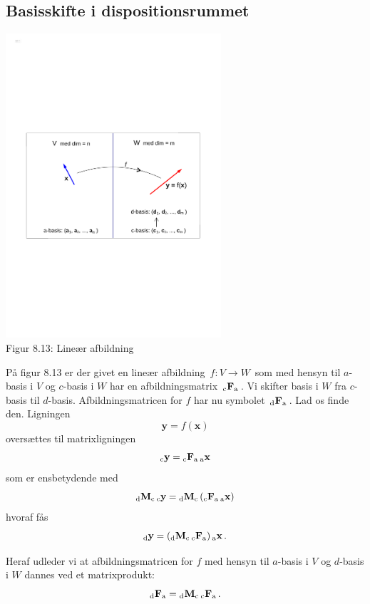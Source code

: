 \subsection{Basisskifte i dispositionsrummet}

\begin{center}
		\includegraphics[trim=2cm 9cm 2cm
 9cm,width=0.60\textwidth,clip]{linAfbVW3.pdf}
  \\Figur 8.13: Lineær afbildning 
\end{center}

På figur 8.13 er der givet en lineær afbildning $\,f:V\rightarrow W\,$ som med hensyn til $a$-basis i $V$ og $c$-basis i $W$ har en afbildningsmatrix $\,{_\mathrm{c}\mathbf{F}_\mathrm{a}}\,$. Vi skifter basis i $W$ fra $c$-basis til $d$-basis. Afbildningsmatricen for $f$ har nu symbolet $\,{_\mathrm{d}\mathbf{F}_\mathrm{a}}\,$. Lad os finde den. Ligningen $$ \mathbf y = f(\mathbf x)$$ oversættes til matrixligningen $$
{_\mathrm{c}\mathbf{y}} ={_\mathrm{c}\mathbf{F}_\mathrm{a}}\,{_\mathrm{a}\mathbf{x}} $$
som er ensbetydende med
$$
{_\mathrm{d}\mathbf{M}_\mathrm{c}}\,{_\mathrm{c}\mathbf{y}}={_\mathrm{d}\mathbf{M}_\mathrm{c}}\,({_\mathrm{c}\mathbf{F}_\mathrm{a}}\,{_\mathrm{a}\mathbf{x}})$$
hvoraf fås
$$
{_\mathrm{d}\mathbf{y}}=({_\mathrm{d}\mathbf{M}_\mathrm{c}}\,{_\mathrm{c}\mathbf{F}_\mathrm{a}})\,{_\mathrm{a}\mathbf{x}}\,.
$$ 

Heraf udleder vi at afbildningsmatricen for $f$ med hensyn til $a$-basis i $V$ og $d$-basis i $W$ dannes ved et matrixprodukt:
\begin{equation}%
 \matind dFa=\matind dMc\,\matind cFa\,.
\end{equation}

